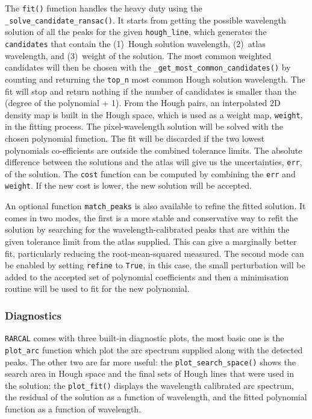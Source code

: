 \documentclass{aa}
\begin{document}
The \texttt{fit()} function handles the heavy duty using the
\texttt{\_solve\_candidate\_ransac()}. It starts from getting the possible
wavelength solution of all the peaks for the given \texttt{hough\_line}, which
generates the \texttt{candidates} that contain the (1)~Hough solution wavelength,
(2)~atlas wavelength, and (3)~weight of the solution. The most common weighted
candidates will then be chosen with the \texttt{\_get\_most\_common\_candidates()}
by counting and returning the \texttt{top\_n} most common Hough solution wavelength.
The fit will stop and return nothing if the number of candidates is smaller than
the (degree of the polynomial + 1). From the Hough pairs, an interpolated 2D
density map is built in the Hough space, which is used as a weight map,
\texttt{weight}, in the fitting process. The pixel-wavelength solution will be
solved with the chosen polynomial function. The fit will be discarded if the two
lowest polynomials co-efficients are outside the combined tolerance limits. The
absolute difference between the solutions and the atlas will give us the
uncertainties, \texttt{err}, of the solution. The \texttt{cost} function can
be computed by combining the \texttt{err} and \texttt{weight}. If the new cost
is lower, the new solution will be accepted.

An optional function \texttt{match\_peaks} is also available to refine the
fitted solution. It comes in two modes, the first is a more stable and
conservative way to refit the solution by searching for the wavelength-calibrated
peaks that are within the given tolerance limit from the atlas supplied. This
can give a marginally better fit, particularly reducing the root-mean-squared
measured. The second mode can be enabled by setting \texttt{refine} to
\texttt{True}, in this case, the small perturbation will be added to the accepted
set of polynomial coefficients and then a minimisation routine will be used to
fit for the new polynomial.

\subsubsection*{Diagnostics}
\texttt{RARCAL} comes with three built-in diagnostic plots, the most basic
one is the \texttt{plot\_arc} function which plot the arc spectrum
supplied along with the detected peaks. The other two are far more useful:
the \texttt{plot\_search\_space()} shows the search area in Hough space and
the final sets of Hough lines that were used in the solution; the
\texttt{plot\_fit()} displays the wavelength calibrated arc spectrum, the
residual of the solution as a function of wavelength, and the fitted polynomial
function as a function of wavelength.
\end{document}
